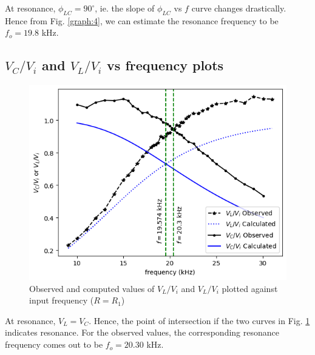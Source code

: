         At resonance, $\phi_{LC} = 90^{\circ}$, ie. the slope of $\phi_{LC}$ vs $f$ curve changes drastically. Hence from Fig. \ref{graph:4}, we can estimate the resonance frequency to be $f_o=19.8$ kHz.

    \subsection{$V_C/V_i$ and $V_L/V_i$ vs frequency plots}

        \begin{figure}[H]
            \centering
            \includegraphics[width=1\columnwidth]{images/g3.png}
            \caption{Observed and computed values of $V_L/V_i$ and $V_L/V_i$ plotted against input frequency ($R=R_1$)}
            \label{graph:5}
        \end{figure}

        At resonance, $V_L = V_C$. Hence, the point of intersection if the two curves in Fig. \ref{graph:5} indicates resonance. For the observed values, the corresponding resonance frequency comes out to be $f_o=20.30$ kHz.
